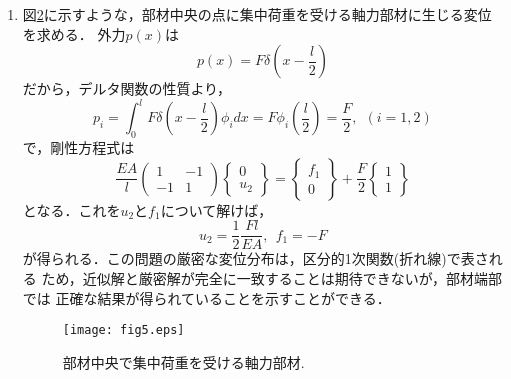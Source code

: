\documentclass[10pt,a4j]{jarticle}
\begin{document}
\begin{enumerate}
\begin{equation}
	\right\}
\end{equation}
と縮約され，
\begin{equation}
	u_2=\frac{p_0l^2}{2EA}, \ \ f_1=-p_0l
\end{equation}
が得られる．よって，変位の近似解は
\begin{equation}
	\tilde u(x)= \frac{p_0l^2}{2EA}\frac{x}{l}
\end{equation}
となる．厳密解は$x$の2次関数だから，この問題では近似解と厳密解は一致し得ない．
しかしながら，部材端部では，近似解と厳密解が一致することを確かめることができる．
\begin{figure}[h]
	\begin{center}
	\texttt{[image: fig4.eps]} 
	\end{center}
	\caption{等分布荷重を受ける軸力部材.} 
	\label{fig:fig4}
\end{figure}
\item
図\ref{fig:fig5}に示すような，部材中央の点に集中荷重を受ける軸力部材に生じる変位を求める．
外力$p(x)$は
\begin{equation}
	p(x)=F\delta \left( x-\frac{l}{2}\right)
\end{equation}
だから，デルタ関数の性質より，
\begin{equation}
	p_i=\int_0^l F \delta\left(x-\frac{l}{2}\right)\phi_i dx =F\phi_i\left(\frac{l}{2}\right)= \frac{F}{2}
	, \ \ (i=1,2)
	\label{eqn:}
\end{equation}
で，剛性方程式は
\begin{equation}
	\frac{EA}{l}
	\left(
	\begin{array}{cc}
		1 & -1 \\
		-1 & 1
	\end{array}
	\right)
	\left\{
	\begin{array}{c}
		0 \\
		u_2
	\end{array}
	\right\}
	=
	\left\{
	\begin{array}{c}
		f_1 \\
		0	
	\end{array}
	\right\}
	+
	\frac{F}{2}
	\left\{
	\begin{array}{c}
		1 \\
		1	
	\end{array}
	\right\}
\end{equation}
となる．これを$u_2$と$f_1$について解けば，
\begin{equation}
	u_2=\frac{1}{2}\frac{Fl}{EA}, \ \ f_1=-F
	\label{eqn:}
\end{equation}
が得られる．この問題の厳密な変位分布は，区分的1次関数(折れ線)で表される
ため，近似解と厳密解が完全に一致することは期待できないが，部材端部では
正確な結果が得られていることを示すことができる．
\begin{figure}[h]
	\begin{center}
	\texttt{[image: fig5.eps]} 
	\end{center}
	\caption{部材中央で集中荷重を受ける軸力部材.} 
	\label{fig:fig5}
\end{figure}
\end{enumerate}
\end{document}
